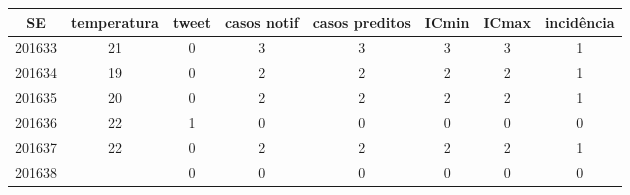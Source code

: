 \begin{tabular}{c|ccccccc}
  \hline
SE & temperatura & tweet & casos notif & casos preditos & ICmin & ICmax & incidência \\ 
  \hline
201633 & 21 & 0 & 3 & 3 & 3 & 3 & 1 \\ 
  201634 & 19 & 0 & 2 & 2 & 2 & 2 & 1 \\ 
  201635 & 20 & 0 & 2 & 2 & 2 & 2 & 1 \\ 
  201636 & 22 & 1 & 0 & 0 & 0 & 0 & 0 \\ 
  201637 & 22 & 0 & 2 & 2 & 2 & 2 & 1 \\ 
  201638 &  & 0 & 0 & 0 & 0 & 0 & 0 \\ 
   \hline
\end{tabular}
